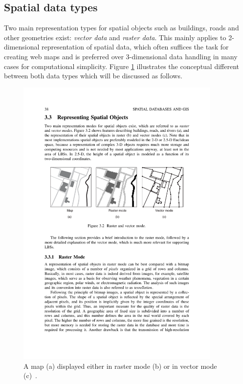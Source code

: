 \subsection{Spatial data types}

Two main representation types for spatial objects such as buildings, roads and other geometries exist: \textit{vector data} and \textit{raster data}. This mainly applies to 2-dimensional representation of spatial data, which often suffices the task for creating web maps and is preferred over 3-dimensional data handling in many cases for computational simplicity. Figure \ref{fig:raster-vector} illustrates the conceptual different between both data types which will be discussed as follows.

\begin{figure}[h]
  \begin{center}
    \includegraphics[width=0.9\textwidth]{figures/raster_vs_vector.pdf}
    \caption{A map (a) displayed either in raster mode (b) or in vector mode (c)~\cite[page~38]{Kupper2005lbs}.}
    \label{fig:raster-vector}
  \end{center}
\end{figure}

